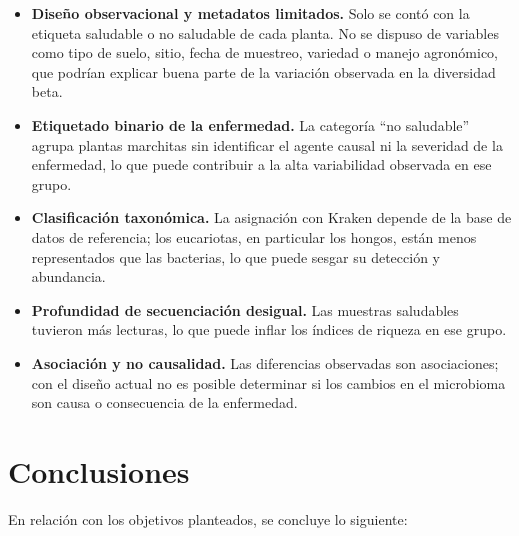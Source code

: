 \begin{itemize}
    \item \textbf{Diseño observacional y metadatos limitados.} Solo se contó con la etiqueta
    saludable o no saludable de cada planta. No se dispuso de variables como tipo de suelo, sitio,
    fecha de muestreo, variedad o manejo agronómico, que podrían explicar buena parte de la
    variación observada en la diversidad beta.
    \item \textbf{Etiquetado binario de la enfermedad.} La categoría ``no saludable'' agrupa
    plantas marchitas sin identificar el agente causal ni la severidad de la enfermedad, lo que
    puede contribuir a la alta variabilidad observada en ese grupo.
    \item \textbf{Clasificación taxonómica.} La asignación con Kraken depende de la base de datos
    de referencia; los eucariotas, en particular los hongos, están menos representados que las
    bacterias, lo que puede sesgar su detección y abundancia.
    \item \textbf{Profundidad de secuenciación desigual.} Las muestras saludables tuvieron más
    lecturas, lo que puede inflar los índices de riqueza en ese grupo.
    \item \textbf{Asociación y no causalidad.} Las diferencias observadas son asociaciones; con el
    diseño actual no es posible determinar si los cambios en el microbioma son causa o consecuencia
    de la enfermedad.
\end{itemize}

\section{Conclusiones}

En relación con los objetivos planteados, se concluye lo siguiente:

